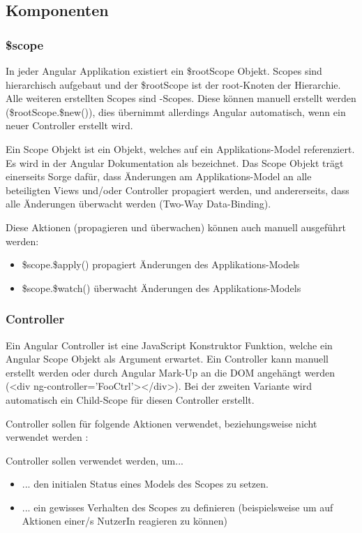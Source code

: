 \subsection{Komponenten}
\subsubsection{\$scope}
In jeder Angular Applikation existiert ein \$rootScope Objekt. Scopes sind hierarchisch aufgebaut und der \$rootScope ist der root-Knoten der Hierarchie. Alle weiteren erstellten Scopes sind -Scopes. Diese können manuell erstellt werden (\$rootScope.\$new()), dies übernimmt allerdings Angular automatisch, wenn ein neuer Controller erstellt wird.

Ein Scope Objekt ist ein Objekt, welches auf ein Applikations-Model referenziert. Es wird in der Angular Dokumentation als  \autocite[Scopes]{Angular:DevGuide} bezeichnet. Das Scope Objekt trägt einerseits Sorge dafür, dass Änderungen am Applikations-Model an alle beteiligten Views und/oder Controller propagiert werden, und andererseits, dass alle Änderungen überwacht werden (Two-Way Data-Binding).

Diese Aktionen (propagieren und überwachen) können auch manuell ausgeführt werden:
\begin{itemize}
  \item \$scope.\$apply() propagiert Änderungen des Applikations-Models
  \item \$scope.\$watch() überwacht Änderungen des Applikations-Models
\end{itemize}

\subsubsection{Controller}
Ein Angular Controller ist eine JavaScript Konstruktor Funktion, welche ein Angular Scope Objekt als Argument erwartet. Ein Controller kann manuell erstellt werden oder durch Angular Mark-Up an die DOM angehängt werden (<div ng-controller='FooCtrl'></div>). Bei der zweiten Variante wird automatisch ein Child-Scope für diesen Controller erstellt.

Controller sollen für folgende Aktionen verwendet, beziehungsweise nicht verwendet werden \autocite[Controllers]{Angular:DevGuide}:

Controller sollen verwendet werden, um...
\begin{itemize}
  \item ... den initialen Status eines Models des Scopes zu setzen.
  \item ... ein gewisses Verhalten des Scopes zu definieren (beispielsweise um auf Aktionen einer/s NutzerIn reagieren zu können)
\end{itemize}

